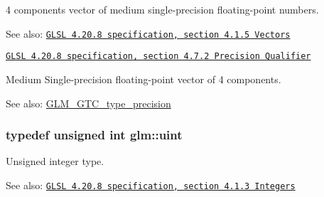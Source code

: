 4 components vector of medium single-precision floating-point numbers.

\begin{Desc}
\item[See also:]\href{http://www.opengl.org/registry/doc/GLSLangSpec.4.20.8.pdf}{\tt GLSL 4.20.8 specification, section 4.1.5 Vectors} 

\href{http://www.opengl.org/registry/doc/GLSLangSpec.4.20.8.pdf}{\tt GLSL 4.20.8 specification, section 4.7.2 Precision Qualifier}\end{Desc}
Medium Single-precision floating-point vector of 4 components. \begin{Desc}
\item[See also:]\hyperlink{group__gtc__type__precision}{GLM\_\-GTC\_\-type\_\-precision} \end{Desc}
\hypertarget{group__core__precision_g4fd29415871152bfb5abd588334147c8}{
\subsubsection[uint]{\setlength{\rightskip}{0pt plus 5cm}typedef unsigned int {\bf glm::uint}}}
\label{group__core__precision_g4fd29415871152bfb5abd588334147c8}


Unsigned integer type.

\begin{Desc}
\item[See also:]\href{http://www.opengl.org/registry/doc/GLSLangSpec.4.20.8.pdf}{\tt GLSL 4.20.8 specification, section 4.1.3 Integers} \end{Desc}
